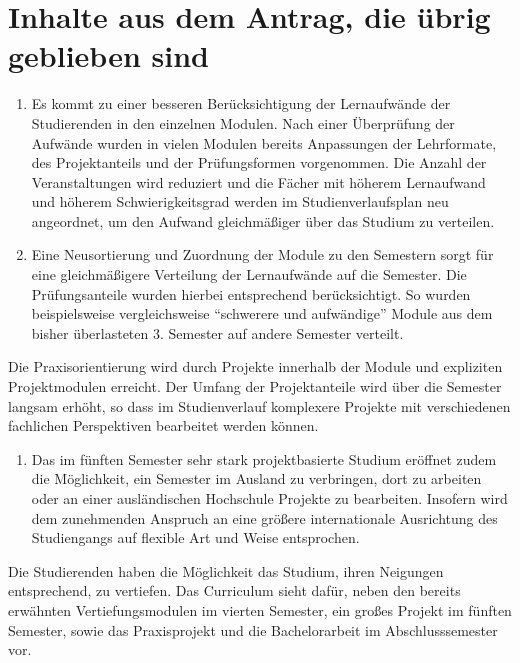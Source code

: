 \chapter{Inhalte aus dem Antrag, die übrig geblieben
sind}\label{inhalte-aus-dem-antrag-die-uxfcbrig-geblieben-sind}

\begin{enumerate}
\def\labelenumi{\arabic{enumi}.}
\tightlist
\item
  Es kommt zu einer besseren Berücksichtigung der Lernaufwände der
  Studierenden in den einzelnen Modulen. Nach einer Überprüfung der
  Aufwände wurden in vielen Modulen bereits Anpassungen der Lehrformate,
  des Projektanteils und der Prüfungsformen vorgenommen. Die Anzahl der
  Veranstaltungen wird reduziert und die Fächer mit höherem Lernaufwand
  und höherem Schwierigkeitsgrad werden im Studienverlaufsplan neu
  angeordnet, um den Aufwand gleichmäßiger über das Studium zu
  verteilen.
\item
  Eine Neusortierung und Zuordnung der Module zu den Semestern sorgt für
  eine gleichmäßigere Verteilung der Lernaufwände auf die Semester. Die
  Prüfungsanteile wurden hierbei entsprechend berücksichtigt. So wurden
  beispielsweise vergleichsweise ``schwerere und aufwändige'' Module aus
  dem bisher überlasteten 3. Semester auf andere Semester verteilt.
\end{enumerate}

Die Praxisorientierung wird durch Projekte innerhalb der Module und
expliziten Projektmodulen erreicht. Der Umfang der Projektanteile wird
über die Semester langsam erhöht, so dass im Studienverlauf komplexere
Projekte mit verschiedenen fachlichen Perspektiven bearbeitet werden
können.

\begin{enumerate}
\def\labelenumi{\arabic{enumi}.}
\setcounter{enumi}{2}
\tightlist
\item
  Das im fünften Semester sehr stark projektbasierte Studium eröffnet
  zudem die Möglichkeit, ein Semester im Ausland zu verbringen, dort zu
  arbeiten oder an einer ausländischen Hochschule Projekte zu
  bearbeiten. Insofern wird dem zunehmenden Anspruch an eine größere
  internationale Ausrichtung des Studiengangs auf flexible Art und Weise
  entsprochen.
\end{enumerate}

Die Studierenden haben die Möglichkeit das Studium, ihren Neigungen
entsprechend, zu vertiefen. Das Curriculum sieht dafür, neben den
bereits erwähnten Vertiefungsmodulen im vierten Semester, ein großes
Projekt im fünften Semester, sowie das Praxisprojekt und die
Bachelorarbeit im Abschlusssemester vor.

